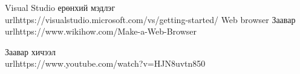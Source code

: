 
\singlespace

\renewcommand{\bibname}{НОМ ЗҮЙ}
\begin{thebibliography}{99}
	Visual Studio ерөнхий мэдлэг
\\url{https://visualstudio.microsoft.com/vs/getting-started/}
	Web browser Заавар
	\\url{https://www.wikihow.com/Make-a-Web-Browser}

	Заавар хичээл
	\\url{https://www.youtube.com/watch?v=HJN8uvtn850}
\end{thebibliography}

